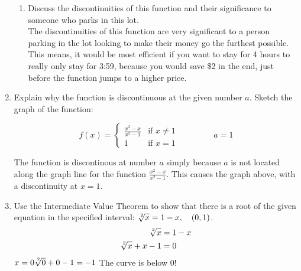 \documentclass{article}
\begin{document}
\begin{enumerate}
\begin{enumerate}
		\item Discuss the discontinuities of this function and their significance to someone who parks in this lot. \\
			The discontinuities of this function are very significant to a person parking in the lot looking to make their money go the furthest possible. This means, it would be most efficient if you want to stay for 4 hours to really only stay for 3:59, because you would save \$2 in the end, just before the function jumps to a higher price.
	\end{enumerate}
\setcounter{enumi}{15}
	\item Explain why the function is discontinuous at the given number $a$. Sketch the graph of the function:
		
		$$f(x)=\begin{cases} 
      		\frac{x^2-x}{x^2-1} & \text{if } x \neq 1 \\
      		1 & \text{if } x = 1
   		\end{cases} \qquad\ \qquad a=1$$
   		
   		\begin{center}
			\pgfplotsset{compat=1.6,width=0.8\linewidth,height=7cm}
		\end{center}
   		
   		The function is discontinous at number $a$ simply because $a$ is not located along the graph line for the function $\frac{x^2-x}{x^2-1}$. This causes the graph above, with a discontinuity at $x=1$.
   		
\setcounter{enumi}{41}
	\item Use the Intermediate Value Theorem to show that there is a root of the given equation in the specified interval: $\sqrt[\leftroot{-1}\uproot{2}2]{x} =1-x,\quad (0,1)$.
	$$\begin{align}
	\sqrt[\leftroot{-1}\uproot{2}2]{x} &= 1-x \\
	\sqrt[\leftroot{-1}\uproot{2}2]{x} + x -1 &= 0 \\
	\end{align}$$
	$x=0 \\
	\sqrt[\leftroot{-1}\uproot{2}2]{0} + 0 - 1 = -1$
	The curve is below 0!
	

\end{enumerate}
\end{document}
